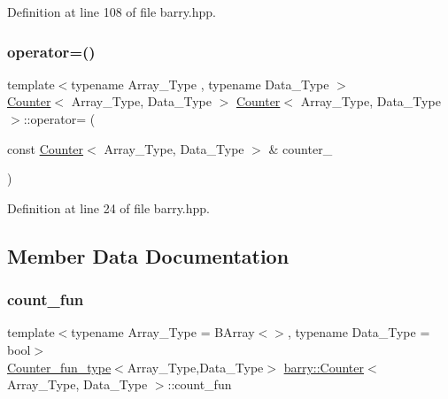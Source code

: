 Definition at line 108 of file barry.\+hpp.

\mbox{\label{classbarry_1_1_counter_a058b8f695d6b6493c5d03aee8c01a86c}} 
\subsubsection{\texorpdfstring{operator=()}{operator=()}}
{\footnotesize\ttfamily template$<$typename Array\+\_\+\+Type , typename Data\+\_\+\+Type $>$ \\
\hyperlink{classbarry_1_1_counter}{Counter}$<$ Array\+\_\+\+Type, Data\+\_\+\+Type $>$ \hyperlink{classbarry_1_1_counter}{Counter}$<$ Array\+\_\+\+Type, Data\+\_\+\+Type $>$\+::operator= (\begin{DoxyParamCaption}\item[{const \hyperlink{classbarry_1_1_counter}{Counter}$<$ Array\+\_\+\+Type, Data\+\_\+\+Type $>$ \&}]{counter\+\_\+ }\end{DoxyParamCaption})}



Definition at line 24 of file barry.\+hpp.



\subsection{Member Data Documentation}
\mbox{\label{classbarry_1_1_counter_aa535e164838a3a9c780e8d15fe45679b}} 
\subsubsection{\texorpdfstring{count\+\_\+fun}{count\_fun}}
{\footnotesize\ttfamily template$<$typename Array\+\_\+\+Type  = B\+Array$<$$>$, typename Data\+\_\+\+Type  = bool$>$ \\
\hyperlink{namespacebarry_abaaae3200da8e4b7faac3c04fe9c3081}{Counter\+\_\+fun\+\_\+type}$<$Array\+\_\+\+Type,Data\+\_\+\+Type$>$ \hyperlink{classbarry_1_1_counter}{barry\+::\+Counter}$<$ Array\+\_\+\+Type, Data\+\_\+\+Type $>$\+::count\+\_\+fun}



